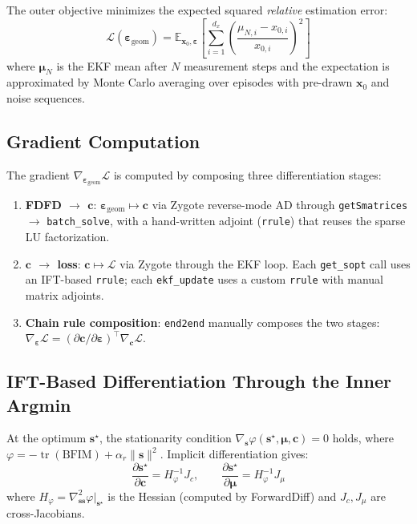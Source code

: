 \documentclass[11pt,a4paper]{article}
\newcommand{\tr}{\operatorname{tr}}
\begin{document}
The outer objective minimizes the expected squared \emph{relative} estimation error:
\[
  \mathcal{L}(\bm{\varepsilon}_{\text{geom}}) = \mathbb{E}_{\bm{x}_0, \bm{\varepsilon}} \left[ \sum_{i=1}^{d_x} \left(\frac{\mu_{N,i} - x_{0,i}}{x_{0,i}}\right)^2 \right]
\]
where $\bm{\mu}_N$ is the EKF mean after $N$ measurement steps and the expectation is approximated by Monte Carlo averaging over episodes with pre-drawn $\bm{x}_0$ and noise sequences.

\subsection{Gradient Computation}

The gradient $\nabla_{\bm{\varepsilon}_{\text{geom}}} \mathcal{L}$ is computed by composing three differentiation stages:

\begin{enumerate}[nosep]
  \item \textbf{FDFD $\to$ $\bm{c}$}: $\bm{\varepsilon}_{\text{geom}} \mapsto \bm{c}$ via Zygote reverse-mode AD through \texttt{getSmatrices} $\to$ \texttt{batch\_solve}, with a hand-written adjoint (\texttt{rrule}) that reuses the sparse LU factorization.

  \item \textbf{$\bm{c}$ $\to$ loss}: $\bm{c} \mapsto \mathcal{L}$ via Zygote through the EKF loop. Each \texttt{get\_sopt} call uses an IFT-based \texttt{rrule}; each \texttt{ekf\_update} uses a custom \texttt{rrule} with manual matrix adjoints.

  \item \textbf{Chain rule composition}: \texttt{end2end} manually composes the two stages: $\nabla_{\bm{\varepsilon}} \mathcal{L} = (\partial \bm{c} / \partial \bm{\varepsilon})^\top \nabla_{\bm{c}} \mathcal{L}$.
\end{enumerate}

\subsection{IFT-Based Differentiation Through the Inner Argmin}

At the optimum $\bm{s}^\star$, the stationarity condition $\nabla_{\bm{s}} \varphi(\bm{s}^\star, \bm{\mu}, \bm{c}) = 0$ holds, where $\varphi = -\tr(\text{BFIM}) + \alpha_r \|\bm{s}\|^2$.  Implicit differentiation gives:
\[
  \frac{\partial \bm{s}^\star}{\partial \bm{c}} = H_\varphi^{-1} J_c, \qquad
  \frac{\partial \bm{s}^\star}{\partial \bm{\mu}} = H_\varphi^{-1} J_\mu
\]
where $H_\varphi = \nabla^2_{\bm{ss}} \varphi|_{\bm{s}^\star}$ is the Hessian (computed by ForwardDiff) and $J_c, J_\mu$ are cross-Jacobians.
\end{document}
